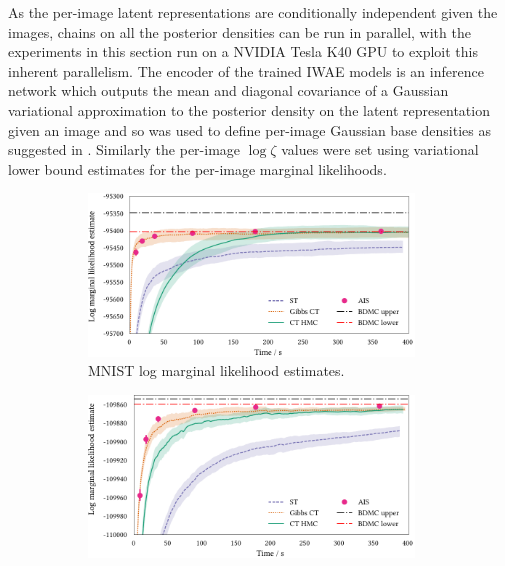 As the per-image latent representations are conditionally independent given the images, chains on all the posterior densities can be run in parallel, with the experiments in this section run on a NVIDIA Tesla K40 \ac{GPU} to exploit this inherent parallelism. The encoder of the trained \ac{IWAE} models is an inference network which outputs the mean and diagonal covariance of a Gaussian variational approximation to the posterior density on the latent representation given an image and so was used to define per-image Gaussian base densities as suggested in \citep{wu2016quantitative}. Similarly the per-image $\log \zeta$ values were set using variational lower bound estimates for the per-image marginal likelihoods.

\begin{figure}
\centering
\begin{subfigure}[t]{\linewidth}
\vskip 0pt
\centering
\includegraphics[width=0.95\textwidth]{images/continuous-tempering/mnist-marginal-likelihood-est}
\caption{MNIST log marginal likelihood estimates.}\label{sfig:mnist-log-marg-lik}
\end{subfigure}%
\vspace{5mm}
\begin{subfigure}[t]{\linewidth}
\vskip 0pt
\centering
\includegraphics[width=0.95\textwidth]{images/continuous-tempering/omni-marginal-likelihood-est}

\end{subfigure}
\end{figure}
